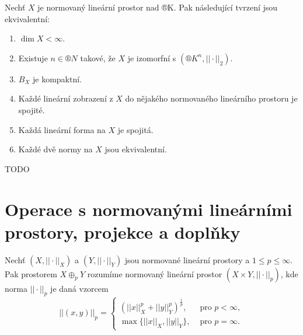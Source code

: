 \documentclass[12pt]{article}					%
\begin{document}
\begin{veta}
	Nechť $X$ je normovaný lineární prostor nad ®K. Pak následující tvrzení jsou ekvivalentní:
	
	\begin{enumerate}
		\item $\dim X < ∞$.
		\item Existuje $n \in ®N$ takové, že $X$ je izomorfní s $(®K^n, ||·||_2)$.
		\item $B_X$ je kompaktní.
		\item Každé lineární zobrazení z $X$ do nějakého normovaného lineárního prostoru je spojité.
		\item Každá lineární forma na $X$ je spojitá.
		\item Každé dvě normy na $X$ jsou ekvivalentní.
	\end{enumerate}

	\begin{dukazin}
		TODO
	\end{dukazin}
\end{veta}

\section{Operace s normovanými lineárními prostory, projekce a doplňky}
\begin{definice}
	Nechť $(X, ||·||_X)$ a $(Y, ||·||_Y)$ jsou normované lineární prostory a $1 ≤ p ≤ ∞$. Pak prostorem $X \oplus_p Y$ rozumíme normovaný lineární prostor $(X \times Y, ||·||_p)$, kde norma $||·||_p$ je daná vzorcem
	$$ ||(x, y)||_p = \begin{cases}(||x||^p_X + ||y||^p_Y)^{\frac{1}{p}}, & \text{ pro } p < ∞, \\ \max\{||x||_X, ||y||_Y\}, & \text{ pro } p = ∞.\end{cases} $$
\end{definice}

\end{document}
